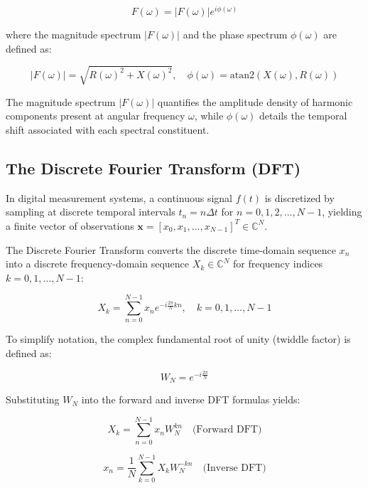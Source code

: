\documentclass[11pt,a4paper]{article}
\begin{document}
\begin{equation}
F(\omega) = |F(\omega)| e^{i \phi(\omega)}
\end{equation}

where the magnitude spectrum $|F(\omega)|$ and the phase spectrum $\phi(\omega)$ are defined as:

\begin{equation}
|F(\omega)| = \sqrt{R(\omega)^2 + X(\omega)^2}, \quad \phi(\omega) = \text{atan2}\left(X(\omega), R(\omega)\right)
\end{equation}

The magnitude spectrum $|F(\omega)|$ quantifies the amplitude density of harmonic components present at angular frequency $\omega$, while $\phi(\omega)$ details the temporal shift associated with each spectral constituent.

\subsection{The Discrete Fourier Transform (DFT)}

In digital measurement systems, a continuous signal $f(t)$ is discretized by sampling at discrete temporal intervals $t_n = n \Delta t$ for $n = 0, 1, 2, \dots, N-1$, yielding a finite vector of observations $\mathbf{x} = [x_0, x_1, \dots, x_{N-1}]^T \in \mathbb{C}^N$.

The Discrete Fourier Transform converts the discrete time-domain sequence $x_n$ into a discrete frequency-domain sequence $X_k \in \mathbb{C}^N$ for frequency indices $k = 0, 1, \dots, N-1$:

\begin{equation}
X_k = \sum_{n=0}^{N-1} x_n e^{-i \frac{2\pi}{N} k n}, \quad k = 0, 1, \dots, N-1
\end{equation}

To simplify notation, the complex fundamental root of unity (twiddle factor) is defined as:

\begin{equation}
W_N = e^{-i \frac{2\pi}{N}}
\end{equation}

Substituting $W_N$ into the forward and inverse DFT formulas yields:

\begin{equation}
X_k = \sum_{n=0}^{N-1} x_n W_N^{k n} \quad \text{(Forward DFT)}
\end{equation}

\begin{equation}
x_n = \frac{1}{N} \sum_{k=0}^{N-1} X_k W_N^{-k n} \quad \text{(Inverse DFT)}
\end{equation}
\end{document}
